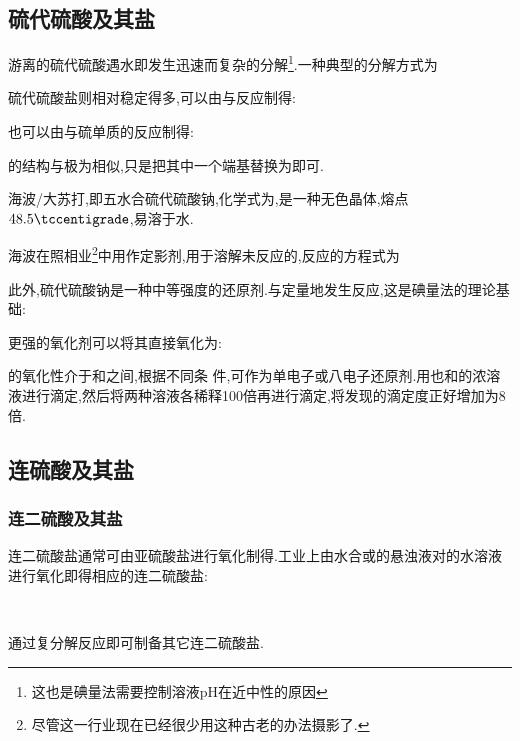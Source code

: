 \documentclass{ctexart}
\begin{document}
\subsection{硫代硫酸及其盐}
游离的硫代硫酸遇水即发生迅速而复杂的分解\footnote{这也是碘量法需要控制溶液pH在近中性的原因}.一种典型的分解方式为
\begin{center}
\end{center}
硫代硫酸盐则相对稳定得多,可以由与反应制得:
\begin{center}
\end{center}
也可以由与硫单质的反应制得:
\begin{center}
\end{center}
\indent {}的结构与极为相似,只是把其中一个端基替换为即可.
\begin{substance}[\ce{Na2S2O3.5H2O}]
    海波/大苏打,即五水合硫代硫酸钠,化学式为,是一种无色晶体,熔点$48.5\tccentigrade$,易溶于水.
\end{substance}
海波在照相业\footnote{尽管这一行业现在已经很少用这种古老的办法摄影了.}中用作定影剂,用于溶解未反应的,反应的方程式为
\begin{center}
\end{center}
此外,硫代硫酸钠是一种中等强度的还原剂.与定量地发生反应,这是碘量法的理论基础:
\begin{center}
\end{center}
更强的氧化剂可以将其直接氧化为:
\begin{center}
\end{center}
的氧化性介于和之间,根据不同条
件,可作为单电子或八电子还原剂.用也和的浓溶液进行滴定,然后将两种溶液各稀释100倍再进行滴定,将发现的滴定度正好增加为8倍.
\subsection{连硫酸及其盐}
\subsubsection{连二硫酸及其盐}
连二硫酸盐通常可由亚硫酸盐进行氧化制得.工业上由水合或的悬浊液对的水溶液进行氧化即得相应的连二硫酸盐:
\begin{center}
    \\
\end{center}
通过复分解反应即可制备其它连二硫酸盐.
\end{document}

